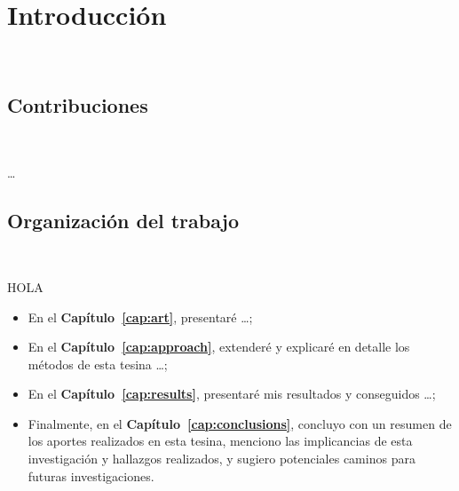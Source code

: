 \chapter{Introducción}
~\label{cap:intro}

\section{Contribuciones}
~\label{cap:intro:sec:contributions}

\ldots

\section{Organización del trabajo}
~\label{cap:intro:sec:outline}

HOLA

\begin{itemize}
	\item En el \textbf{Capítulo~\ref{cap:art}}, presentaré \ldots ;

	\item En el \textbf{Capítulo~\ref{cap:approach}}, extenderé y explicaré en detalle
	      los métodos de esta tesina \ldots ;

	\item En el \textbf{Capítulo~\ref{cap:results}}, presentaré mis resultados y
	      conseguidos \ldots;

	\item Finalmente, en el \textbf{Capítulo~\ref{cap:conclusions}}, concluyo con un
	      resumen de los aportes realizados en esta tesina, menciono las implicancias de
	      esta investigación y hallazgos realizados, y sugiero potenciales caminos para
	      futuras investigaciones. %

\end{itemize}

